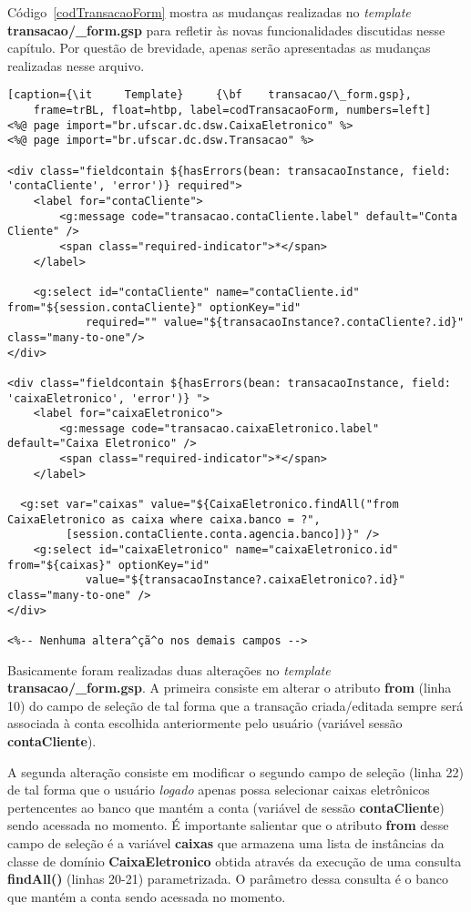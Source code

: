 Código~\ref{codTransacaoForm}  mostra as mudanças  realizadas no  {\it template}
{\bf  transacao/\_form.gsp} para  refletir às  novas  funcionalidades discutidas
nesse capítulo. Por questão de  brevidade, apenas serão apresentadas as mudanças
realizadas nesse arquivo.  

\begin{lstlisting}[caption={\it     Template}     {\bf    transacao/\_form.gsp},
    frame=trBL, float=htbp, label=codTransacaoForm, numbers=left]
<%@ page import="br.ufscar.dc.dsw.CaixaEletronico" %>
<%@ page import="br.ufscar.dc.dsw.Transacao" %>

<div class="fieldcontain ${hasErrors(bean: transacaoInstance, field: 'contaCliente', 'error')} required">
	<label for="contaCliente">
		<g:message code="transacao.contaCliente.label" default="Conta Cliente" />
		<span class="required-indicator">*</span>
	</label>

	<g:select id="contaCliente" name="contaCliente.id" from="${session.contaCliente}" optionKey="id" 
            required="" value="${transacaoInstance?.contaCliente?.id}" class="many-to-one"/>
</div>

<div class="fieldcontain ${hasErrors(bean: transacaoInstance, field: 'caixaEletronico', 'error')} ">
	<label for="caixaEletronico">
		<g:message code="transacao.caixaEletronico.label" default="Caixa Eletronico" />
		<span class="required-indicator">*</span>
	</label>
        
  <g:set var="caixas" value="${CaixaEletronico.findAll("from CaixaEletronico as caixa where caixa.banco = ?", 
         [session.contaCliente.conta.agencia.banco])}" />
	<g:select id="caixaEletronico" name="caixaEletronico.id" from="${caixas}" optionKey="id" 
            value="${transacaoInstance?.caixaEletronico?.id}" class="many-to-one" />
</div>

<%-- Nenhuma altera^çã^o nos demais campos -->

\end{lstlisting}

Basicamente   foram  realizadas   duas   alterações  no   {\it  template}   {\bf
  transacao/\_form.gsp}. A  primeira consiste em  alterar o atributo  {\bf from}
(linha  10) do  campo de  seleção de  tal forma  que a  transação criada/editada
sempre  será associada à  conta escolhida  anteriormente pelo  usuário (variável
sessão {\bf contaCliente}).  

A segunda alteração consiste em modificar  o segundo campo de seleção (linha 22)
de  tal  forma  que  o  usuário  {\it logado}  apenas  possa  selecionar  caixas
eletrônicos pertencentes  ao banco que mantém  a conta (variável  de sessão {\bf
  contaCliente})  sendo  acessada  no  momento.  É importante  salientar  que  o
atributo  {\bf from}  desse  campo de  seleção  é a  variável  {\bf caixas}  que
armazena  uma lista  de instâncias  da classe  de domínio  {\bf CaixaEletronico}
obtida  através da  execução  de  uma consulta  {\bf  findAll()} (linhas  20-21)
parametrizada. O  parâmetro dessa consulta  é o banco  que mantém a  conta sendo
acessada no momento.

